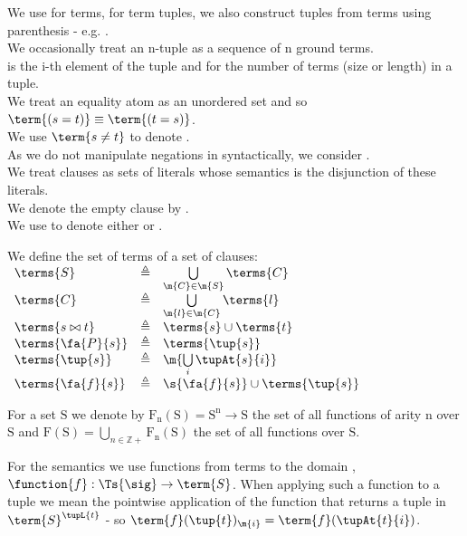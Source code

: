 We use  for terms,  for term tuples,
we also construct tuples from terms using parenthesis - e.g. .\\
We occasionally treat an n-tuple as a sequence of n ground terms.\\
 is the i-th element of the tuple  and  for the number of terms (size or length) in a tuple. \\
We treat an equality atom as an unordered set and so $\term{(s=t)} \equiv \term{(t=s)}$.\\
We use $\term{s \neq t}$ to denote .\\
As we do not manipulate negations in syntactically, we consider .\\
We treat clauses as sets of literals whose semantics is the disjunction of these literals.\\
We denote the empty clause by \emptyClause.\\
We use \term{\bowtie} to denote either \term{=} or \term{\neq}.

We define the set of terms of a set of clauses:\\
$
\begin{array}{llll}
\terms{S}           & \triangleq & \bigcup\limits_{\m{C} \in \m{S}} \terms{C} \\ 
\terms{C}           & \triangleq & \bigcup\limits_{\m{l} \in \m{C}} \terms{l} \\ 
\terms{s \bowtie t} & \triangleq & \terms{s} \cup \terms{t} \\ 
\terms{\fa{P}{s}}   & \triangleq & \terms{\tup{s}} \\ 
\terms{\tup{s}}     & \triangleq & \m{\bigcup\limits_{i} \tupAt{s}{i}} \\ 
\terms{\fa{f}{s}}   & \triangleq & \s{\fa{f}{s}} \cup \terms{\tup{s}} \\
\end{array}
$

For a set $\mathrm{S}$ we denote by $\mathrm{F_n(S)} = \mathrm{S^n} \rightarrow \mathrm{S}$ the set of all functions of arity $\mathrm{n}$ over $\mathrm{S}$ and $\mathrm{F(S)} = \bigcup\limits_{n \in \mathbb{Z}+} \mathrm{F_n(S)}$ the set of all functions over $\mathrm{S}$.

For the semantics we use functions from terms to the domain , $\function{f} : \Ts{\sig} \rightarrow \term{S}$.
When applying such a function to a tuple  we mean the pointwise application of the function that returns a tuple in
$\term{S}^{\tupL{t}}$ - so $\term{f}(\tup{t})_{\m{i}} = \term{f}(\tupAt{t}{i})$.


